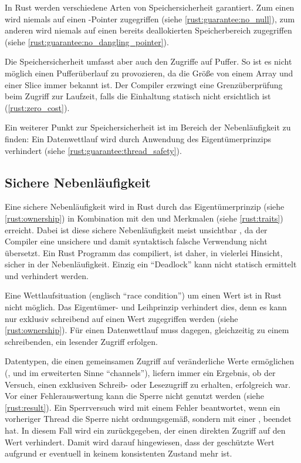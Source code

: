 In Rust werden verschiedene Arten von Speichersicherheit garantiert. Zum einen wird niemals auf einen -Pointer zugegriffen (siehe \autoref{rust:guarantee:no_null}), zum anderen wird niemals auf einen bereits deallokierten Speicherbereich zugegriffen (siehe \autoref{rust:guarantee:no_dangling_pointer}).

Die Speichersicherheit umfasst aber auch den Zugriffe auf Puffer. So ist es nicht möglich einen Pufferüberlauf zu provozieren, da die Größe von einem Array und einer Slice immer bekannt ist.
Der Compiler erzwingt eine Grenzüberprüfung beim Zugriff zur Laufzeit, falls die Einhaltung statisch nicht ersichtlich ist (\autoref{rust:zero_cost}).

Ein weiterer Punkt zur Speichersicherheit ist im Bereich der Nebenläufigkeit zu finden: Ein Datenwettlauf wird durch Anwendung des Eigentümerprinzips verhindert (siehe \autoref{rust:guarantee:thread_safety}).

\subsection{Sichere Nebenläufigkeit}
\label{rust:guarantee:thread_safety}

Eine sichere Nebenläufigkeit wird in Rust durch das Eigentümerprinzip (siehe \autoref{rust:ownership}) in Kombination mit den  und  Merkmalen (siehe \autoref{rust:traits}) erreicht.
Dabei ist diese sichere Nebenläufigkeit meist unsichtbar \cite[41]{rust:orly_programming}, da der Compiler eine unsichere und damit syntaktisch falsche Verwendung nicht übersetzt.
Ein Rust Programm das compiliert, ist daher, in vielerlei Hinsicht, sicher in der Nebenläufigkeit.
Einzig ein \enquote{Deadlock} kann nicht statisch ermittelt und verhindert werden.

Eine Wettlaufsituation (englisch \enquote{race condition}) um einen Wert ist in Rust nicht möglich.
Das Eigentümer- und Leihprinzip verhindert dies, denn es kann nur exklusiv schreibend auf einen Wert zugegriffen werden (siehe \autoref{rust:ownership}).
Für einen Datenwettlauf muss dagegen, gleichzeitig zu einem schreibenden, ein lesender Zugriff erfolgen.

Datentypen, die einen gemeinsamen Zugriff auf veränderliche Werte ermöglichen (,  und im erweiterten Sinne \enquote{channels}), liefern immer ein Ergebnis, ob der  Versuch, einen exklusiven Schreib- oder Lesezugriff zu erhalten, erfolgreich war.
Vor einer Fehlerauswertung kann die Sperre nicht genutzt werden (siehe \autoref{rust:result}).
Ein Sperrversuch wird mit einem Fehler beantwortet, wenn ein vorheriger Thread die Sperre nicht ordnungsgemäß, sondern mit einer , beendet hat.
In diesem Fall wird ein  zurückgegeben, der einen direkten Zugriff auf den Wert verhindert.
Damit wird darauf hingewiesen, dass der geschützte Wert aufgrund er  eventuell in keinem konsistenten Zustand mehr ist.

